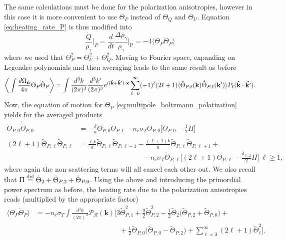 The same calculations must be done for the polarization anisotropies, however in this case it is more convenient to use $\Theta_P$ instead of $\Theta_Q$ and $\Theta_U$. Equation \eqref{eq:heating_rate_P} is thus modified into $$\frac{\dot Q}{\rho_\gamma}\bigg|_P=\frac{d}{dt}\frac{\Delta \rho_\gamma}{\rho_\gamma}\bigg|_\text{P}=-4\langle\Theta_P\dot \Theta_P\rangle$$
where we used that $\Theta_P^2=\Theta_U^2+\Theta_Q^2$. Moving to Fourier space, expanding on Legendre polynomials and then averaging leads to the same result as before 
\begin{align*}
    \bigg\langle\int\frac{d\Omega_{\mathbf{\hat{n}}}}{4\pi}\Theta_P\dot \Theta_P\bigg\rangle=\int\frac{d^3k}{(2\pi)^3}\frac{d^3k'}{(2\pi)^3}e^{i(\mathbf{\hat{k}}+\mathbf{\hat{k}}')\cdot\mathbf{x}}\sum_{\ell=0}^{\infty}(-1)^\ell(2\ell+1)\langle\tilde\Theta_{P,\ell}(\mathbf{k})\dot{\tilde\Theta}_{P,\ell}(\mathbf{k}')\rangle P_\ell(\mathbf{\hat{k}}\cdot\mathbf{\hat{k'}}).
\end{align*}
Now, the equation of motion for $\Theta_P$ \eqref{eq:multipole_boltzmann_polatization} yields for the averaged products
\begin{align*}
    \tilde{\Theta}_{P,0}\dot{\tilde{\Theta}}_{P,0}&=-\frac{k}{a}\tilde{\Theta}_{P,0}\tilde{\Theta}_{P,1}-n_e\sigma_T\tilde{\Theta}_{P,0}\bigg[\tilde\Theta_{P,0}-\frac{1}{2}\Pi\bigg]\\
     (2\ell+1)\tilde{\Theta}_{P,\ell}\dot{\tilde{\Theta}}_{P,\ell}&=\frac{\ell k}{a}\tilde{\Theta}_{P,\ell}\tilde\Theta_{P,\ell-1}-\frac{(\ell+1)k}{a}\tilde{\Theta}_{P,\ell}\tilde\Theta_{P,\ell+1}+\\&\qquad\quad\qquad\qquad\qquad-n_e\sigma_T\tilde{\Theta}_{P,\ell}\bigg[(2\ell+1)\tilde\Theta_{P,\ell}-\frac{\delta_{\ell,2}}{2}\Pi\bigg]\ \ell\geq 1,
 \end{align*}
where again the non-scattering terms will all cancel each other out. We also recall that $\Pi\stackrel{\text{def}}{=}\tilde\Theta_2+\tilde\Theta_{P,2}+\tilde\Theta_{P,0}$. Using the above and introducing the primordial power spectrum as before, the heating rate due to the polarization anisotropies reads (multiplied by the appropriate factor)
\begin{align}
    \langle\Theta_P\dot \Theta_P\rangle&=-n_e\sigma_T\int\frac{d^3k}{(2\pi)^3}\mathcal{P}_\mathcal{R} (\mathbf{k})\bigg[3\tilde\Theta_{P,1}^2+\frac{9}{2}\tilde\Theta_{P,2}^2-\frac{1}{2}\tilde\Theta_2\big(\tilde\Theta_{P,2}+\tilde\Theta_{P,0}\big)+\nonumber\\&\qquad\qquad\qquad\qquad\qquad\qquad+\frac{1}{2}\tilde\Theta_{P,0}\big(\tilde\Theta_{P,0}-\tilde\Theta_{P,2}\big)+\sum_{\ell=3}^{\infty}(2\ell+1)\tilde\Theta_\ell^2\bigg].
    \label{eq:TT_P_average_scalar}
\end{align}
